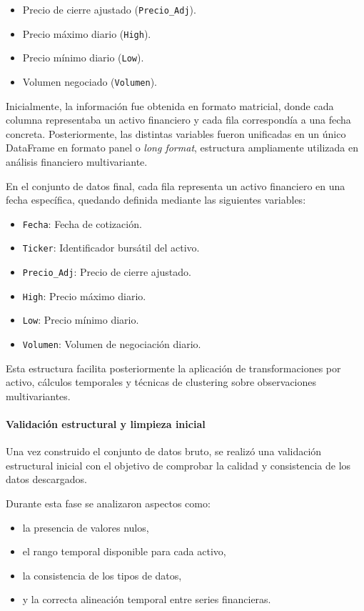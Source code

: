\documentclass[
]{article}
\begin{document}
\begin{itemize}
\item Precio de cierre ajustado (\texttt{Precio\_Adj}).
\item Precio máximo diario (\texttt{High}).
\item Precio mínimo diario (\texttt{Low}).
\item Volumen negociado (\texttt{Volumen}).
\end{itemize}

Inicialmente, la información fue obtenida en formato matricial, donde cada columna representaba un activo financiero y cada fila correspondía a una fecha concreta. Posteriormente, las distintas variables fueron unificadas en un único DataFrame en formato panel o \textit{long format}, estructura ampliamente utilizada en análisis financiero multivariante.

En el conjunto de datos final, cada fila representa un activo financiero en una fecha específica, quedando definida mediante las siguientes variables:

\begin{itemize}
\item \texttt{Fecha}: Fecha de cotización.
\item \texttt{Ticker}: Identificador bursátil del activo.
\item \texttt{Precio\_Adj}: Precio de cierre ajustado.
\item \texttt{High}: Precio máximo diario.
\item \texttt{Low}: Precio mínimo diario.
\item \texttt{Volumen}: Volumen de negociación diario.
\end{itemize}

Esta estructura facilita posteriormente la aplicación de transformaciones por activo, cálculos temporales y técnicas de \gls{clustering} sobre observaciones multivariantes.

\paragraph{Validación estructural y limpieza inicial}

Una vez construido el conjunto de datos bruto, se realizó una validación estructural inicial con el objetivo de comprobar la calidad y consistencia de los datos descargados.

Durante esta fase se analizaron aspectos como:

\begin{itemize}
\item la presencia de valores nulos,
\item el rango temporal disponible para cada activo,
\item la consistencia de los tipos de datos,
\item y la correcta alineación temporal entre series financieras.
\end{itemize}
\end{document}
